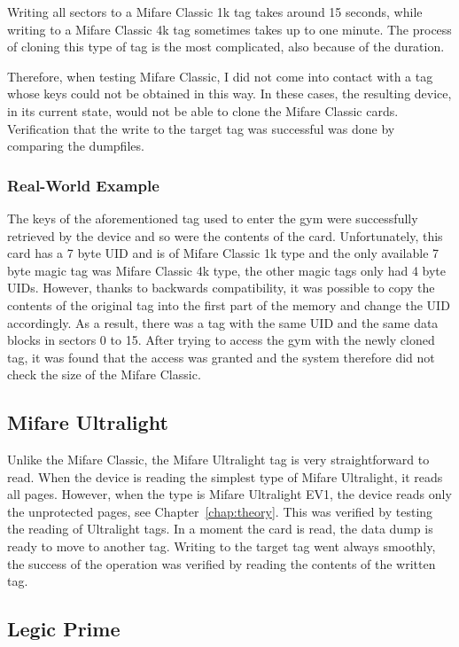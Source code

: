 Writing all sectors to a Mifare Classic 1k tag takes around 15 seconds, while writing to a Mifare Classic 4k tag sometimes takes up to one minute. The process of cloning this type of tag is the most complicated, also because of the duration.

Therefore, when testing Mifare Classic, I did not come into contact with a tag whose keys could not be obtained in this way. In these cases, the resulting device, in its current state, would not be able to clone the Mifare Classic cards. Verification that the write to the target tag was successful was done by comparing the dumpfiles.

\subsubsection{Real-World Example}
The keys of the aforementioned tag used to enter the gym were successfully retrieved by the device and so were the contents of the card. Unfortunately, this card has a 7 byte UID and is of Mifare Classic 1k type and the only available 7 byte magic tag was Mifare Classic 4k type, the other magic tags only had 4 byte UIDs. However, thanks to backwards compatibility, it was possible to copy the contents of the original tag into the first part of the memory and change the UID accordingly. As a result, there was a tag with the same UID and the same data blocks in sectors 0 to 15. After trying to access the gym with the newly cloned tag, it was found that the access was granted and the system therefore did not check the size of the Mifare Classic.

\subsection{Mifare Ultralight}

Unlike the Mifare Classic, the Mifare Ultralight tag is very straightforward to read. When the device is reading the simplest type of Mifare Ultralight, it reads all pages. However, when the type is Mifare Ultralight EV1, the device reads only the unprotected pages, see Chapter~\ref{chap:theory}. This was verified by testing the reading of Ultralight tags. In a moment the card is read, the data dump is ready to move to another tag. Writing to the target tag went always smoothly, the success of the operation was verified by reading the contents of the written tag. 

\subsection{Legic Prime}

